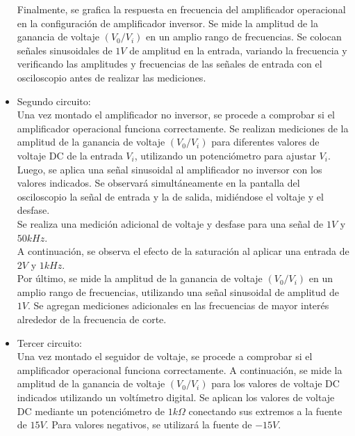 \documentclass[12pt]{article}
\begin{document}
\begin{itemize}
		Finalmente, se grafica la respuesta en frecuencia del amplificador operacional en la configuración de amplificador inversor. Se mide la amplitud de la ganancia de voltaje $(V_0/V_i)$ en un amplio rango de frecuencias. Se colocan señales sinusoidales de $1V$ de amplitud en la entrada, variando la frecuencia y verificando las amplitudes y frecuencias de las señales de entrada con el osciloscopio antes de realizar las mediciones.
		
		\item Segundo circuito:\\
		
		Una vez montado el amplificador no inversor, se procede a comprobar si el amplificador operacional funciona correctamente. Se realizan mediciones de la amplitud de la ganancia de voltaje $(V_0/V_i)$ para diferentes valores de voltaje DC de la entrada $V_i$, utilizando un potenciómetro para ajustar $V_i$.\\
		
		Luego, se aplica una señal sinusoidal al amplificador no inversor con los valores indicados. Se observará simultáneamente en la pantalla del osciloscopio la señal de entrada y la de salida, midiéndose el voltaje y el desfase.\\
		
		Se realiza una medición adicional de voltaje y desfase para una señal de $1V$ y $50kHz$.\\
		
		A continuación, se observa el efecto de la saturación al aplicar una entrada de $2V$ y $1kHz$.\\
		
		Por último, se mide la amplitud de la ganancia de voltaje $(V_0/V_i)$ en un amplio rango de frecuencias, utilizando una señal sinusoidal de amplitud de $1V$. Se agregan mediciones adicionales en las frecuencias de mayor interés alrededor de la frecuencia de corte.\\
		
		\item Tercer circuito:\\
		
		Una vez montado el seguidor de voltaje, se procede a comprobar si el amplificador operacional funciona correctamente. A continuación, se mide la amplitud de la ganancia de voltaje $(V_0/V_i)$ para los valores de voltaje DC indicados utilizando un voltímetro digital. Se aplican los valores de voltaje DC mediante un potenciómetro de $1k\Omega$ conectando sus extremos a la fuente de $15V$. Para valores negativos, se utilizará la fuente de $-15V$.\\
		

\end{itemize}
\end{document}
